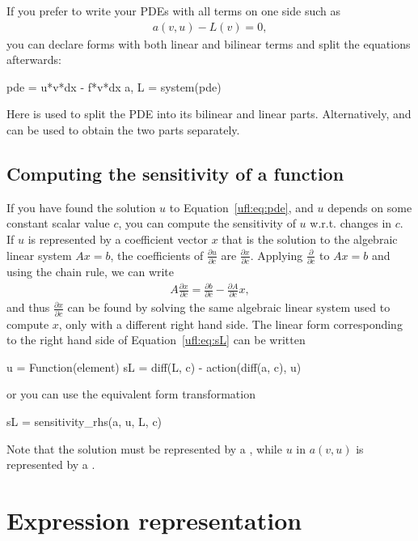 If you prefer to write your PDEs with all terms on one side such as
\begin{align}\label{ufl:eq:pde}
a(v, u) - L(v) = 0,
\end{align}
you can declare forms with both linear and bilinear terms
and split the equations afterwards:
\begin{code}
pde = u*v*dx - f*v*dx
a, L = system(pde)
\end{code}
Here  is used to split the PDE into its bilinear and
linear parts.  Alternatively,  and  can be used
to obtain the two parts separately.

\subsection{Computing the sensitivity of a function} \label{ufl:sec:sensitivity}
If you have found the solution $u$ to Equation~\eqref{ufl:eq:pde}, and
$u$ depends on some constant scalar value $c$, you can compute the
sensitivity of $u$ w.r.t. changes in $c$.  If $u$ is represented by a
coefficient vector $x$ that is the solution to the algebraic linear
system $A x = b$, the coefficients of $\frac{\partial u}{\partial c}$
are $\frac{\partial x}{\partial c}$.  Applying $\frac{\partial
}{\partial c}$ to $A x = b$ and using the chain rule, we can write
\begin{align}\label{ufl:eq:sL}
A \frac{\partial x}{\partial c} = \frac{\partial b}{\partial c} - \frac{\partial A}{\partial c} x,
\end{align}
and thus $\frac{\partial x}{\partial c}$ can be found by solving the
same algebraic linear system used to compute $x$, only with a
different right hand side.  The linear form corresponding to the right
hand side of Equation~\eqref{ufl:eq:sL} can be written
\begin{code}
u = Function(element)
sL = diff(L, c) - action(diff(a, c), u)
\end{code}
or you can use the equivalent form transformation
\begin{code}
sL = sensitivity_rhs(a, u, L, c)
\end{code}
Note that the solution  must be represented by a
, while $u$ in $a(v, u)$ is represented
by a .


\section{Expression representation} \label{ufl:sec:representation}

